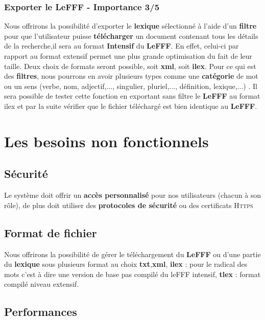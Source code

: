 \subsubsection{Exporter le LeFFF - Importance 3/5}

{Nous offrirons la possibilité d'exporter le \textbf{lexique} sélectionné à l'aide d'un \textbf{filtre} pour que l'utilisateur puisse \textbf{télécharger} un document contenant tous les détails de la recherche,il sera au format \textbf{Intensif} du \textbf{LeFFF}. En effet, celui-ci par rapport au format extensif permet une plus grande optimisation du fait de leur taille. Deux choix de formats seront possible, soit \textbf{xml}, soit \textbf{ilex}. Pour ce qui est des \textbf{filtres}, nous pourrons en avoir plusieurs types comme une \textbf{catégorie} de mot ou un sens (verbe, nom, adjectif,..., singulier, pluriel,..., définition, lexique,...) . Il sera possible de tester cette fonction en exportant sans filtre le \textbf{LeFFF} au format ilex et par la suite vérifier que le fichier téléchargé est bien identique au \textbf{LeFFF}.\par}

\newpage
\section{Les besoins non fonctionnels}

\subsection{Sécurité}
{Le système doit offrir un \textbf{accès personnalisé} pour nos utilisateurs (chacun à son rôle), de plus doit utiliser des \textbf{protocoles de sécurité} ou des certificats \textsc{Https} }

\subsection{Format de fichier}
Nous offrirons la possibilité de gérer le téléchargement du \textbf{LeFFF} ou d'une partie du \textbf{lexique} sous plusieurs format au choix  \textbf{txt},\textbf{xml}, \textbf{ilex} : pour le radical des mots c'est à dire une version de base pas compilé du leFFF intensif, \textbf{tlex} : format compilé niveau extensif.

\subsection{Performances}

